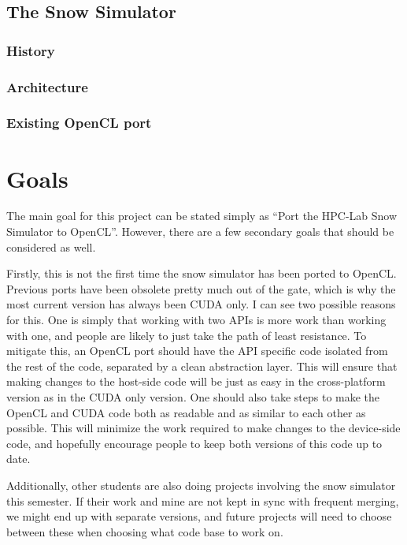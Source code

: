 \subsection{The Snow Simulator}
\subsubsection*{History}

\subsubsection*{Architecture}

\subsubsection*{Existing OpenCL port}

\section{Goals}
The main goal for this project can be stated simply as “Port the HPC-Lab Snow Simulator to OpenCL”. However, there are a few secondary goals that should be considered as well.

Firstly, this is not the first time the snow simulator has been ported to OpenCL. Previous ports have been obsolete pretty much out of the gate, which is why the most current version has always been CUDA only. I can see two possible reasons for this. One is simply that working with two APIs is more work than working with one, and people are likely to just take the path of least resistance. To mitigate this, an OpenCL port should have the API specific code isolated from the rest of the code, separated by a clean abstraction layer. This will ensure that making changes to the host-side code will be just as easy in the cross-platform version as in the CUDA only version. One should also take steps to make the OpenCL and CUDA code both as readable and as similar to each other as possible. This will minimize the work required to make changes to the device-side code, and hopefully encourage people to keep both versions of this code up to date.

Additionally, other students are also doing projects involving the snow simulator this semester. If their work and mine are not kept in sync with frequent merging, we might end up with separate versions, and future projects will need to choose between these when choosing what code base to work on.

